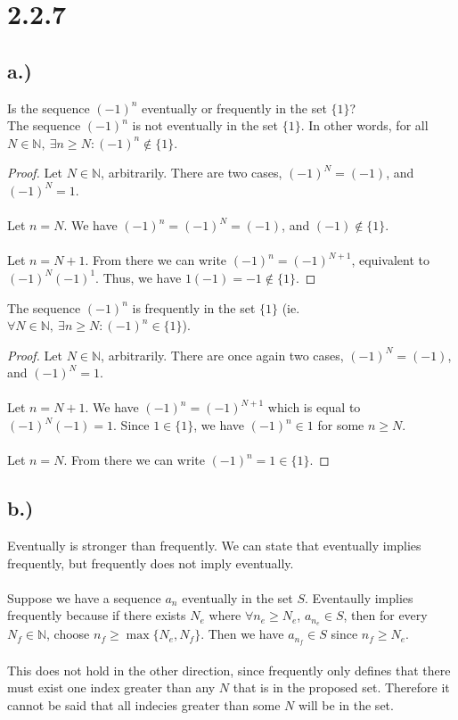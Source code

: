 \documentclass{article}
\begin{document}
\section*{2.2.7}
	\subsection*{a.)}
		Is the sequence $(-1)^n$ eventually or frequently in the set $\{ 1 \}$? \\

		The sequence $(-1)^n$ is not eventually in the set $\{ 1 \}$. In other words, for all $N \in \mathbb{N}, \ \exists n \geqslant N : (-1)^n \notin \{ 1 \}$.
		\begin{proof}
			Let $N \in \mathbb{N}$, arbitrarily.
			There are two cases, $(-1)^N = (-1)$, and $(-1)^N = 1$. \\\\
			 Let $n = N$.
			We have $(-1)^n = (-1)^N = (-1)$, and $(-1) \notin \{ 1 \}$. \\\\
			 Let $n = N +1$.
			From there we can write $(-1)^n = (-1)^{N+1}$, equivalent to $(-1)^N(-1)^1$.
			Thus, we have $1(-1) = -1 \notin \{ 1 \}$.

		\end{proof}
		
		The sequence $(-1)^n$ is frequently in the set $\{ 1 \}$ (ie. $\forall N \in \mathbb{N}, \ \exists n \geqslant N : (-1)^n \in \{ 1 \}$).
		\begin{proof}
			Let $N \in \mathbb{N}$, arbitrarily.
			There are once again two cases, $(-1)^N = (-1)$, and $(-1)^N = 1$. \\\\
			 Let $n = N + 1$.
			We have $(-1)^n = (-1)^{N+1}$ which is equal to $(-1)^N(-1) = 1$.
			Since $1 \in \{ 1 \}$, we have  $(-1)^n \in 1$ for some $n \geqslant N$.\\\\
			 Let $n = N$.
			From there we can write $(-1)^n = 1 \in \{ 1 \}$.

		\end{proof}
	\subsection*{b.)}
		Eventually is stronger than frequently.
		We can state that eventually implies frequently, but frequently does not imply eventually.\\\\
		Suppose we have a sequence $a_n$ eventually in the set $S$.
		Eventaully implies frequently because if there exists $N_e$ where $\forall n_e \geqslant N_e$, $a_{n_e} \in S$, then for every $N_f \in \mathbb{N}$, choose $n_f \geqslant \max \{N_e, N_f \}$.
		Then we have $a_{n_f} \in S$ since $n_f \geqslant N_e$. \\\\
		This does not hold in the other direction, since frequently only defines that there must exist one index greater than any $N$ that is in the proposed set.
		Therefore it cannot be said that all indecies greater than some $N$ will be in the set.
\end{document}
